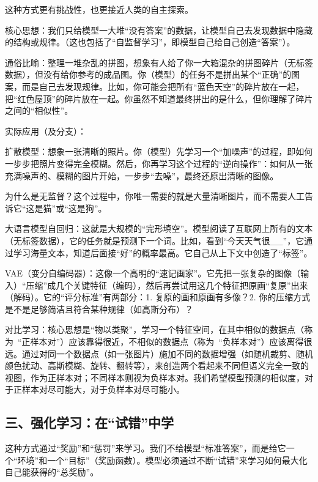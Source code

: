 这种方式更有挑战性，也更接近人类的自主探索。

核心思想：我们只给模型一大堆``没有答案''的数据，让模型自己去发现数据中隐藏的结构或规律。（这也包括了``自监督学习''，即模型自己给自己创造``答案''）。

通俗比喻：整理一堆杂乱的拼图，想象有人给了你一大箱混杂的拼图碎片（无标签数据），但没有给你参考的成品图。你（模型）的任务不是拼出某个``正确''的图案，而是自己去发现规律。比如，你可能会把所有``蓝色天空''的碎片放在一起，把``红色屋顶''的碎片放在一起。你虽然不知道最终拼出的是什么，但你理解了碎片之间的``相似性''。

实际应用（及分支）：

扩散模型：想象一张清晰的照片。你（模型）先学习一个``加噪声''的过程，即如何一步步把照片变得完全模糊。然后，你再学习这个过程的``逆向操作''：如何从一张充满噪声的、模糊的图片开始，一步步``去噪''，最终还原出清晰的图像。

为什么是无监督？这个过程中，你唯一需要的就是大量清晰图片，而不需要人工告诉它``这是猫''或``这是狗''。

大语言模型自回归：这就是大规模的``完形填空''。模型阅读了互联网上所有的文本（无标签数据），它的任务就是预测下一个词。比如，看到``今天天气很\_\_''，它通过学习海量文本，知道后面接``好''的概率最高。它自己从上下文中创造了``标签''。

VAE（变分自编码器）：这像一个高明的``速记画家''。它先把一张复杂的图像（输入）``压缩''成几个关键特征（编码），然后再尝试用这几个特征把原画``复原''出来（解码）。它的``评分标准''有两部分：1. 复原的画和原画有多像？2. 你的压缩方式是不是足够简洁且符合某种规律（如高斯分布）？

对比学习：核心思想是``物以类聚''，学习一个特征空间，在其中相似的数据点（称为~``正样本对''）应该靠得很近，不相似的数据点（称为~``负样本对''）应该离得很远。通过对同一个数据点（如一张图片）施加不同的数据增强（如随机裁剪、随机颜色扰动、高斯模糊、旋转、翻转等），来创造两个看起来不同但语义完全一致的视图，作为正样本对；不同样本则视为负样本对。我们希望模型预测的相似度，对于正样本对尽可能大，对于负样本对尽可能小。

\hypertarget{ux4e09ux5f3aux5316ux5b66ux4e60ux5728ux8bd5ux9519ux4e2dux5b66}{%
\subsection{三、强化学习：在``试错''中学}\label{ux4e09ux5f3aux5316ux5b66ux4e60ux5728ux8bd5ux9519ux4e2dux5b66}}

这种方式通过``奖励''和``惩罚''来学习。我们不给模型``标准答案''，而是给它一个``环境''和一个``目标''（奖励函数）。模型必须通过不断``试错''来学习如何最大化自己能获得的``总奖励''。

